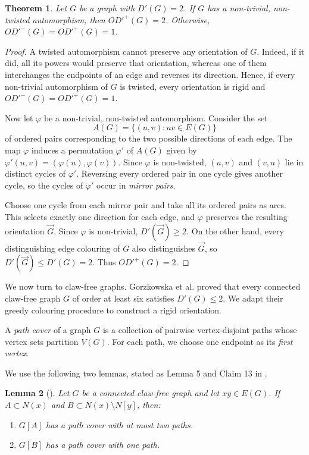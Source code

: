 \documentclass[a4paper,12pt]{elsarticle}
\newtheorem{theorem}{Theorem}
\newtheorem{lemma}[theorem]{Lemma}
\newcommand{\orG}{\ensuremath{\overrightarrow{G}}}
\begin{document}
\begin{theorem}
Let $G$ be a graph with $D'(G)=2$. If $G$ has a non-trivial, non-twisted automorphism, then $OD'^+(G)=2$. Otherwise, $OD'^-(G)=OD'^+(G)=1$.
\end{theorem}
\begin{proof}
A twisted automorphism cannot preserve any orientation of $G$. Indeed, if it did, all its powers would preserve that orientation, whereas one of them interchanges the endpoints of an edge and reverses its direction. Hence, if every non-trivial automorphism of $G$ is twisted, every orientation is rigid and $OD'^-(G)=OD'^+(G)=1$.

Now let $\varphi$ be a non-trivial, non-twisted automorphism. Consider the set
\[
A(G)=\{(u,v):uv\in E(G)\}
\]
of ordered pairs corresponding to the two possible directions of each edge. The map $\varphi$ induces a permutation $\varphi'$ of $A(G)$ given by $\varphi'(u,v)=(\varphi(u),\varphi(v))$. Since $\varphi$ is non-twisted, $(u,v)$ and $(v,u)$ lie in distinct cycles of $\varphi'$. Reversing every ordered pair in one cycle gives another cycle, so the cycles of $\varphi'$ occur in \emph{mirror pairs}.

Choose one cycle from each mirror pair and take all its ordered pairs as arcs. This selects exactly one direction for each edge, and $\varphi$ preserves the resulting orientation $\orG$. Since $\varphi$ is non-trivial, $D'(\orG)\geq 2$. On the other hand, every distinguishing edge colouring of $G$ also distinguishes $\orG$, so $D'(\orG)\leq D'(G)=2$. Thus $OD'^+(G)=2$.
\end{proof}

We now turn to claw-free graphs. Gorzkowska et al. \cite{GorzkowskaKargul} proved that every connected claw-free graph $G$ of order at least six satisfies $D'(G)\leq 2$. We adapt their greedy colouring procedure to construct a rigid orientation.

A \emph{path cover} of a graph $G$ is a collection of pairwise vertex-disjoint paths whose vertex sets partition $V(G)$. For each path, we choose one endpoint as its \emph{first vertex}.

We use the following two lemmas, stated as Lemma 5 and Claim 13 in \cite{GorzkowskaKargul}.

\begin{lemma}[\cite{GorzkowskaKargul}] \label{lem: pathcover}
Let $G$ be a connected claw-free graph and let $xy\in E(G)$. If $A\subset N(x)$ and $B\subset N(x)\setminus N[y]$, then:
\begin{enumerate}[1.]
\item $G[A]$ has a path cover with at most two paths.
\item $G[B]$ has a path cover with one path.
\end{enumerate}
\end{lemma}
\end{document}
